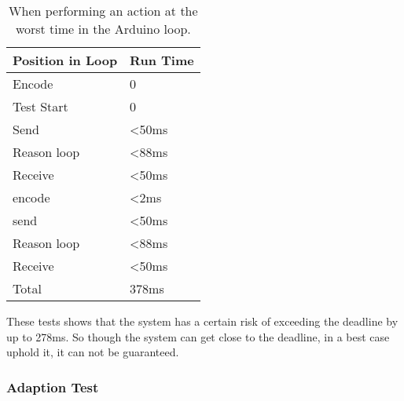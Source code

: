 \begin{center}
	\begin{table}[htbp]
	  \centering
	  \begin{tabular}{l l}
		\toprule
		Position in Loop		& Run Time  \\ \midrule
		Encode 			        & 0  	  	\\ \midrule
		Test Start		        & 0  		\\ \midrule
		Send   			        & <50ms     \\ \midrule
		Reason loop 	        & <88ms     \\ \midrule
		Receive 		        & <50ms     \\ \midrule
		encode 			        & <2ms      \\ \midrule
		send   			        & <50ms     \\ \midrule
		Reason loop 	        & <88ms	    \\ \midrule
		Receive 		        & <50ms     \\ \midrule \midrule
		Total			        & 378ms     \\
                                            \bottomrule
	  \end{tabular}
	  \caption[An approximation of a worst case run time of each separate module]{When performing an action at the worst time in the Arduino loop.}
	\end{table}
 \label{Table:WorstRunTimeAprox}
\end{center}
These tests shows that the system has a certain risk of exceeding the deadline by up to 278ms. So though the system can get close to the deadline, in a best case uphold it, it can not be guaranteed.

\subsubsection{Adaption Test} 